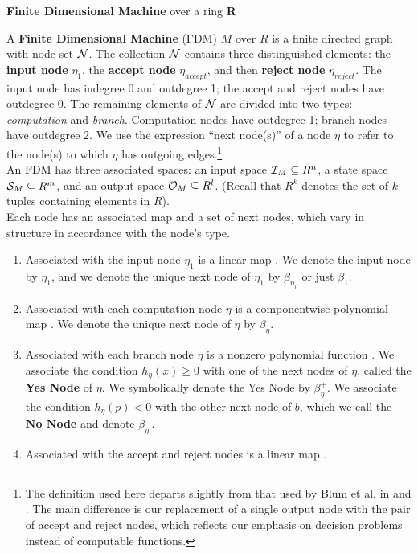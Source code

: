 \begin{definition}{\textbf{Finite Dimensional Machine} over a ring
    \textbf{R}}
  
  A \textbf{Finite Dimensional Machine} (FDM) $M$ over $R$ is a finite
  directed graph with node set $\mathcal{N}$.  The collection $\mathcal{N}$
  contains three distinguished elements: the \textbf{input node}
  $\eta_1$, the \textbf{accept node} $\eta_{accept}$, and then
  \textbf{reject node} $\eta_{reject}$. The input node has indegree 0
  and outdegree 1; the accept and reject nodes have outdegree 0.  The
  remaining elements of $\mathcal{N}$ are divided into two types:
  \emph{computation} and \emph{branch}. Computation nodes have
  outdegree 1; branch nodes have outdegree 2.  We use the expression
  ``next node(s)'' of a node $\eta$ to refer to the node(s) to which
  $\eta$ has outgoing edges.\footnote{The definition used here departs
    slightly from that used by Blum et al. in \cite{B98} and
    \cite{B89}.  The main difference is our replacement of a single
    output node with the pair of accept and reject nodes, which
    reflects our emphasis on decision problems instead of computable
    functions.}\\
  
  An FDM has three associated spaces: an input space $\mathcal{I}_M
  \subseteq R^n$, a state space $\mathcal{S}_M \subseteq R^m$, and an
  output space $\mathcal{O}_M \subseteq R^l$.  (Recall that $R^k$
  denotes the set of $k$-tuples containing elements in $R$).\\

  Each node has an associated map and a set of next nodes, which vary
  in structure in accordance with the node's type.

  \begin{enumerate}
  \item Associated with the input node $\eta_1$ is a linear map
    . We denote the input node
    by $\eta_1$, and we denote the unique next node of $\eta_1$ by
    $\beta_{\eta_1}$ or just $\beta_1$.
    
  \item Associated with each computation node $\eta$ is a
    componentwise polynomial map
    . We denote the
    unique next node of $\eta$ by $\beta_\eta$.
    
  \item Associated with each branch node $\eta$ is a nonzero
    polynomial function .  We
    associate the condition $h_\eta(x) \geq 0$ with one of the next
    nodes of $\eta$, called the \textbf{Yes Node} of $\eta$.  We
    symbolically denote the Yes Node by $\beta_\eta^+$. We associate
    the condition $h_\eta(p) < 0$ with the other next node of $b$,
    which we call the \textbf{No Node} and denote $\beta_\eta^-$.
    
  \item Associated with the accept and reject nodes is a linear map
    .
  \end{enumerate}
\end{definition}

